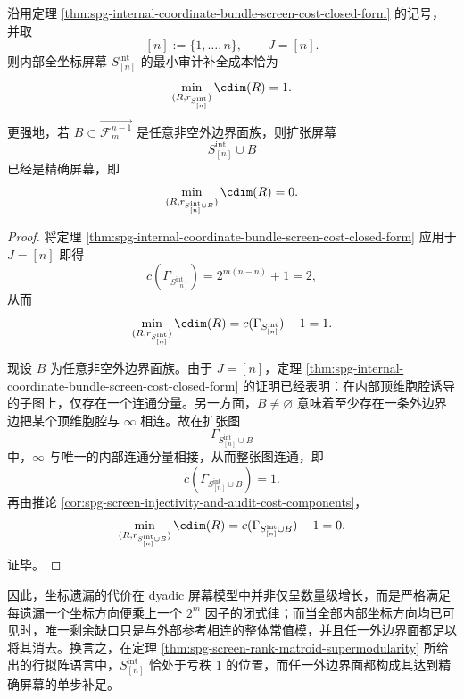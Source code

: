 \begin{corollary}[内部全坐标屏幕的唯一缺口与任意外边界闭合]\label{cor:spg-full-internal-screen-one-defect-boundary-closure}
沿用定理 \ref{thm:spg-internal-coordinate-bundle-screen-cost-closed-form} 的记号，并取
\[
[n]:=\{1,\dots,n\},
\qquad
J=[n].
\]
则内部全坐标屏幕 \(S_{[n]}^{\mathrm{int}}\) 的最小审计补全成本恰为
\[
\min_{(R,r_{S_{[n]}^{\mathrm{int}}})}\cdim(R)=1.
\]
更强地，若 \(B\subset \overrightarrow{\mathcal F_m^{n-1}}\) 是任意非空外边界面族，则扩张屏幕
\[
S_{[n]}^{\mathrm{int}}\cup B
\]
已经是精确屏幕，即
\[
\min_{(R,r_{S_{[n]}^{\mathrm{int}}\cup B})}\cdim(R)=0.
\]
\end{corollary}
\begin{proof}
将定理 \ref{thm:spg-internal-coordinate-bundle-screen-cost-closed-form} 应用于 \(J=[n]\) 即得
\[
c(\Gamma_{S_{[n]}^{\mathrm{int}}})=2^{m(n-n)}+1=2,
\]
从而
\[
\min_{(R,r_{S_{[n]}^{\mathrm{int}}})}\cdim(R)=c(\Gamma_{S_{[n]}^{\mathrm{int}}})-1=1.
\]

现设 \(B\) 为任意非空外边界面族。由于 \(J=[n]\)，定理
\ref{thm:spg-internal-coordinate-bundle-screen-cost-closed-form}
的证明已经表明：在内部顶维胞腔诱导的子图上，仅存在一个连通分量。另一方面，\(B\neq\varnothing\) 意味着至少存在一条外边界边把某个顶维胞腔与 \(\infty\) 相连。故在扩张图
\[
\Gamma_{S_{[n]}^{\mathrm{int}}\cup B}
\]
中，\(\infty\) 与唯一的内部连通分量相接，从而整张图连通，即
\[
c(\Gamma_{S_{[n]}^{\mathrm{int}}\cup B})=1.
\]
再由推论 \ref{cor:spg-screen-injectivity-and-audit-cost-components}，
\[
\min_{(R,r_{S_{[n]}^{\mathrm{int}}\cup B})}\cdim(R)
=
c(\Gamma_{S_{[n]}^{\mathrm{int}}\cup B})-1
=0.
\]
证毕。
\end{proof}

\noindent
因此，坐标遗漏的代价在 dyadic 屏幕模型中并非仅呈数量级增长，而是严格满足每遗漏一个坐标方向便乘上一个 \(2^m\) 因子的闭式律；而当全部内部坐标方向均已可见时，唯一剩余缺口只是与外部参考相连的整体常值模，并且任一外边界面都足以将其消去。换言之，在定理 \ref{thm:spg-screen-rank-matroid-supermodularity} 所给出的行拟阵语言中，\(S_{[n]}^{\mathrm{int}}\) 恰处于亏秩 \(1\) 的位置，而任一外边界面都构成其达到精确屏幕的单步补足。

\endinput
